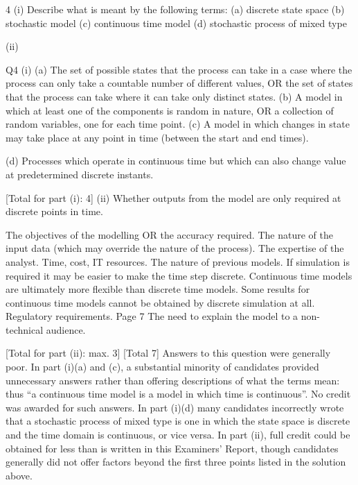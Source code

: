 \documentclass[a4paper,12pt]{article}
\begin{document}
4
(i)
Describe what is meant by the following terms:
(a) discrete state space
(b) stochastic model
(c) continuous time model
(d)
stochastic process of mixed type

(ii)



Q4
(i)
(a) The set of possible states that the process can take in a case where the
process can only take a countable number of different values,
OR
the set of states that the process can take where it can take only distinct
states. 
(b) A model in which at least one of the components is random in nature,
OR
a collection of random variables, one for each time point. 
(c) A model in which changes in state may take place at any point in time
(between the start and end times).

(d) Processes which operate in continuous time but which can also change
value at predetermined discrete instants.

[Total for part (i): 4]
(ii)
Whether outputs from the model are only required at discrete points in time.

The objectives of the modelling
OR
the accuracy required. 
The nature of the input data (which may override the nature of the
process). 
The expertise of the analyst. 
Time, cost, IT resources. 
The nature of previous models. 
If simulation is required it may be easier to make the time step discrete. 
Continuous time models are ultimately more flexible than discrete time
models. 
Some results for continuous time models cannot be obtained by discrete
simulation at all. 
Regulatory requirements. 
Page 7
The need to explain the model to a non-technical audience.

[Total for part (ii): max. 3]
[Total 7]
Answers to this question were generally poor. In part (i)(a) and
(c), a substantial minority of candidates provided unnecessary
answers rather than offering descriptions of what the terms mean:
thus “a continuous time model is a model in which time is
continuous”. No credit was awarded for such answers. In part
(i)(d) many candidates incorrectly wrote that a stochastic process
of mixed type is one in which the state space is discrete and the time
domain is continuous, or vice versa. In part (ii), full credit could be
obtained for less than is written in this Examiners’ Report, though
candidates generally did not offer factors beyond the first three
points listed in the solution above.
\end{document}
